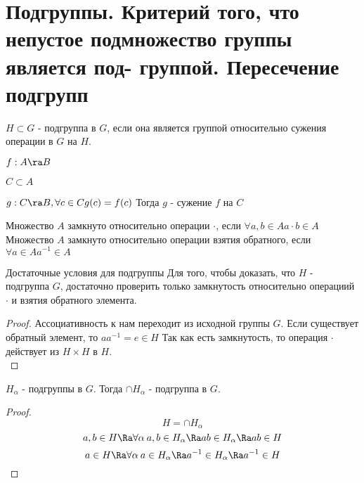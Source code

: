 \section{Подгруппы. Критерий того, что непустое подмножество группы является под-
группой. Пересечение подгрупп}
\begin{Def}
	$H \subset G$ - подгруппа в $G$, если она является группой относительно сужения операции в $G$ на $H$. \\
\end{Def}

\begin{Def}
	$f: A \ra B$
	
	$C \subset A$
	
	$g: C \ra B, \forall c \in C g(c) = f(c)$
	Тогда $g$ - сужение $f$ на $C$	\\
\end{Def}

\begin{Def}
	Множество $A$ замкнуто относительно операции $\cdot$, если $\forall a, b \in A a \cdot b \in A$
	Множество $A$ замкнуто относительно операции взятия обратного, если $\forall a \in A a^{-1} \in A$ \\
\end{Def}

\begin{theorem}{Достаточные условия для подгруппы}
Для того, чтобы доказать, что $H$ - подгруппа $G$, достаточно проверить только замкнутость относительно операциий $\cdot$ и взятия обратного элемента. \\
\end{theorem}
\begin{proof}
Ассоциативность к нам переходит из исходной группы $G$.
Если существует обратный элемент, то $a a^{-1} = e \in H$
Так как есть замкнутость, то операция $\cdot$ действует из $H \times H$ в $H$.   \\
\end{proof}

\begin{theorem}{}
	$H_\alpha$ - подгруппы в $G$. Тогда $\cap H_\alpha$ - подгруппа в $G$.
\end{theorem}
\begin{proof}
	$$H = \cap H_\alpha$$
	$$a, b \in H \Ra \forall \alpha \: a, b \in H_\alpha \Ra ab \in H_\alpha \Ra ab \in H$$
	$$a \in H \Ra \forall \alpha \: a \in H_\alpha \Ra a^{-1} \in H_\alpha \Ra a^{-1} \in H$$
	
\end{proof}
